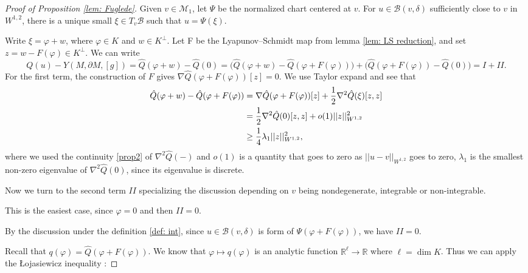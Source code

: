 \documentclass[12pt]{amsart}
\newcommand{\M}{{\mathcal{M}}}
\newcommand{\vphi}{\varphi}
\newcommand{\na}{{\nabla}}
\newcommand{\B}{\mathcal{B}}
\begin{document}
\begin{proof}[Proof of Proposition \ref{lem: Fuglede}]
Given $v \in \M_1$, let $\Psi$ be the normalized chart centered at $v$. For $u \in \B(v,\delta)$ sufficiently close to $v$ in $W^{1,2}$, there is a unique small $\xi \in T_v \B$ such that $u= \Psi (\xi)$.

Write $\xi = \vphi + w$, where $\vphi \in K $ and $w\in K^\perp$.
Let F be the Lyapunov–Schmidt map from lemma \ref{lem: LS reduction}, and set $z=w-F(\vphi) \in K^\perp$. We can write 
\begin{equation}
    Q(u)-Y(M,\partial M ,[g])= \hat{Q}(\vphi+w) - \hat{Q}(0) = \big(\hat{Q}(\vphi+w)- \hat{Q}(\vphi+F(\vphi)) \big) +\big(\hat{Q}(\vphi+F(\vphi)) -\hat{Q}(0) \big) = I +II.
\end{equation}
For the first term,
the construction of $F$ gives $\na \hat{Q} (\vphi+F(\vphi))[z]=0$. We use Taylor expand
and see that 
\begin{align}\label{e:finalcoerciveestimate}
\hat{Q}(\vphi+w)-\hat{Q}(\vphi +F(\vphi)) &= \na \hat{Q} (\vphi+F(\vphi))[z] + \frac{1}{2} \na ^2\hat{Q}(\xi)[z,z] \notag\\
&=\frac{1}{2} \na ^2\hat{Q}(0)[z,z] + o(1)||z||^2_{W^{1,2}}\notag \\
&\geq \frac{1}{4} \lambda_1||z||^2_{W^{1,2}},
\end{align}
where we used  the continuity \eqref{prop2} of $\na^2  \hat{Q}(-)$ and $o(1)$ is a quantity that goes to zero as $||u-v||_{W^{1,2}}$ goes to zero, $\lambda_1$ is the smallest non-zero eigenvalue of $\na^2 \hat{Q}(0)$, since its eigenvalue is discrete.




Now we turn to the second term $II$ specializing the discussion depending on $v$ being nondegenerate, integrable or non-integrable.
 

\smallskip

 This is the easiest case, since $\vphi=0$ and then $II = 0$.

\smallskip

 By the discussion under the definition \ref{def: int}, since $u\in \B(v,\delta)$ is form of $\Psi(\vphi+F(\vphi))$,  we have $II=0$.

\smallskip

 Recall that $q(\vphi)= \hat{Q}(\vphi+F(\vphi))$. We know that $\vphi \mapsto q(\vphi)$ is an analytic function  $\mathbb R^\ell\rightarrow \mathbb R$ where $\ell = \dim K$. Thus we can apply the \L ojasiewicz inequality\cite{Lio65} : 


\end{proof}
\end{document}
